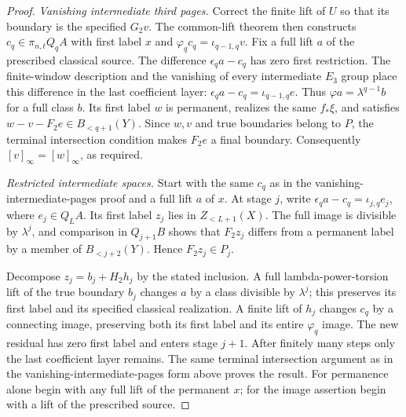 \begin{proof}
\textit{Vanishing intermediate third pages.}
Correct the finite lift of $U$ so that its boundary is the specified
$G_2v$. The common-lift theorem then constructs
$c_q\in\pi_{n,t}Q_qA$ with first label $x$ and
$\varphi_qc_q=\iota_{q-1,q}v$.
Fix a full lift $a$ of the prescribed classical source.
The difference $\epsilon_qa-c_q$ has zero first restriction.
The finite-window description and the vanishing of every intermediate
$E_3$ group place this difference in the last coefficient layer:
$\epsilon_qa-c_q=\iota_{q-1,q}e$.
Thus $\varphi a=\lambda^{q-1}b$ for a full class $b$.
Its first label $w$ is permanent, realizes the same $f_*\xi$, and
satisfies $w-v-F_2e\in B_{<q+1}(Y)$.
Since $w,v$ and true boundaries belong to $P$, the terminal
intersection condition makes $F_2e$ a final boundary.
Consequently $[v]_\infty=[w]_\infty$, as required.

\textit{Restricted intermediate spaces.}
Start with the same $c_q$ as in the vanishing-intermediate-pages proof and a full lift $a$
of $x$. At stage $j$, write
$\epsilon_qa-c_q=\iota_{j,q}e_j$, where $e_j\in Q_LA$.
Its first label $z_j$ lies in $Z_{<L+1}(X)$.
The full image is divisible by $\lambda^j$, and comparison in
$Q_{j+1}B$ shows that $F_2z_j$ differs from a permanent label by
a member of $B_{<j+2}(Y)$. Hence $F_2z_j\in P_j$.

Decompose $z_j=b_j+H_2h_j$ by the stated inclusion.
A full lambda-power-torsion lift of the true boundary $b_j$ changes
$a$ by a class divisible by $\lambda^j$; this preserves its first
label and its specified classical realization. A finite lift of $h_j$
changes $c_q$ by a connecting image, preserving both its first label
and its entire $\varphi_q$ image. The new residual has zero first
label and enters stage $j+1$.
After finitely many steps only the last coefficient layer remains.
The same terminal intersection argument as in
the vanishing-intermediate-pages form above proves the result.
For permanence alone begin with any full lift of the permanent $x$;
for the image assertion begin with a lift of the prescribed source.
\end{proof}


